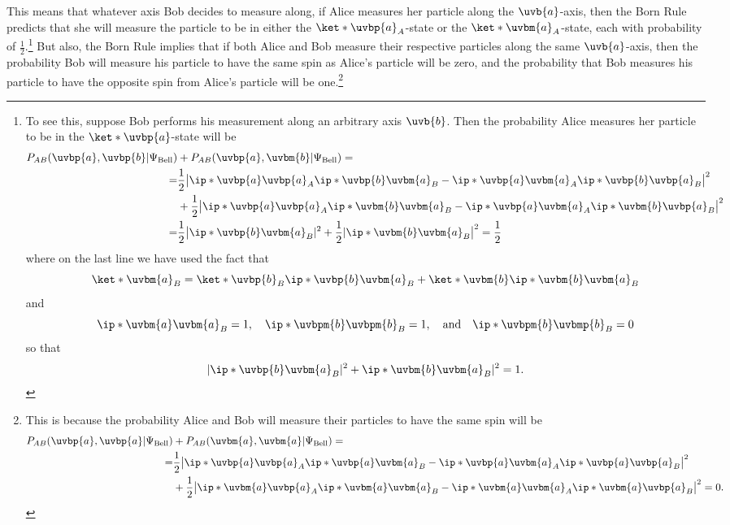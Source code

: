 \documentclass[12pt]{report}
\begin{document}
This means that whatever axis Bob decides to measure along, if Alice measures her particle along the $\uvb{a}$-axis, then the Born Rule predicts that she will measure the particle to be in either the $\ket*{\uvbp{a}}_A$-state or the $\ket*{\uvbm{a}}_A$-state, each with probability of $\frac{1}{2}$.\footnote{To see this, suppose Bob performs his measurement along an arbitrary axis $\uvb{b}$. Then the probability Alice measures her particle to be in the $\ket*{\uvbp{a}}$-state will be 
\begin{equation}
    \begin{split}
        P_{AB}(\uvbp{a}, \uvbp{b}|\Psi_{\text{Bell}})&+P_{AB}(\uvbp{a}, \uvbm{b}|\Psi_{\text{Bell}})= \\
        =&\frac{1}{2}\big| \ip*{\uvbp{a}}{\uvbp{a}}_A\ip*{\uvbp{b}}{\uvbm{a}}_B-\ip*{\uvbp{a}}{\uvbm{a}}_A\ip*{\uvbp{b}}{\uvbp{a}}_B\big|^2\\
        &+\frac{1}{2}\big|\ip*{\uvbp{a}}{\uvbp{a}}_A\ip*{\uvbm{b}}{\uvbm{a}}_B-\ip*{\uvbp{a}}{\uvbm{a}}_A\ip*{\uvbm{b}}{\uvbp{a}}_B\big|^2\\
        =&\frac{1}{2}\big|\ip*{\uvbp{b}}{\uvbm{a}}_B|^2+\frac{1}{2}|\ip*{\uvbm{b}}{\uvbm{a}}_B\big|^2=\frac{1}{2}
    \end{split}
\end{equation} 
where on the last line we have used the fact that 
$$\ket*{\uvbm{a}}_B=\ket*{\uvbp{b}}_B\ip*{\uvbp{b}}{\uvbm{a}}_B+\ket*{\uvbm{b}}\ip*{\uvbm{b}}{\uvbm{a}}_B$$
and 
$$\ip*{\uvbm{a}}{\uvbm{a}}_B=1,\quad\ip*{\uvbpm{b}}{\uvbpm{b}}_B=1,\quad\text{and}\quad \ip*{\uvbpm{b}}{\uvbmp{b}}_B=0$$
so that 
$$|\ip*{\uvbp{b}}{\uvbm{a}}_B|^2+\ip*{\uvbm{b}}{\uvbm{a}}_B|^2=1.$$
} But also, the Born Rule implies that if both Alice and Bob measure their respective particles along the same $\uvb{a}$-axis, then the probability Bob will measure his particle to have the same spin as Alice's particle will be zero, and the probability that Bob measures his particle to have the opposite spin from Alice's particle will be one.\footnote{This is because the probability Alice and Bob will measure their particles to have the same spin will be 
\begin{equation*}
\begin{split}
    P_{AB}(\uvbp{a}, \uvbp{a}|\Psi_{\text{Bell}})&+P_{AB}(\uvbm{a}, \uvbm{a}|\Psi_{\text{Bell}})= \\
    =&\frac{1}{2}\big| \ip*{\uvbp{a}}{\uvbp{a}}_A\ip*{\uvbp{a}}{\uvbm{a}}_B-\ip*{\uvbp{a}}{\uvbm{a}}_A\ip*{\uvbp{a}}{\uvbp{a}}_B\big|^2\\
    &+\frac{1}{2}\big|\ip*{\uvbm{a}}{\uvbp{a}}_A\ip*{\uvbm{a}}{\uvbm{a}}_B-\ip*{\uvbm{a}}{\uvbm{a}}_A\ip*{\uvbm{a}}{\uvbp{a}}_B\big|^2=0.

\end{split}
\end{equation*}}
\end{document}
